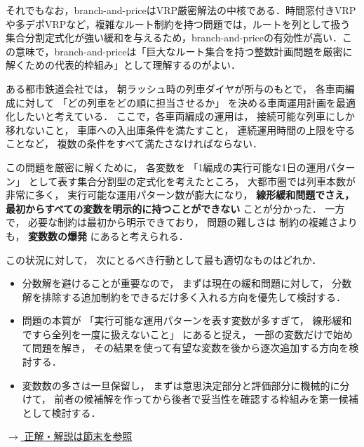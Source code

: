 それでもなお，branch-and-priceはVRP厳密解法の中核である．時間窓付きVRPや多デポVRPなど，複雑なルート制約を持つ問題では，ルートを列として扱う集合分割定式化が強い緩和を与えるため，branch-and-priceの有効性が高い．この意味で，branch-and-priceは「巨大なルート集合を持つ整数計画問題を厳密に解くための代表的枠組み」として理解するのがよい．



\begin{example}[title={クイズ5：解法の選択１}]
ある都市鉄道会社では，
朝ラッシュ時の列車ダイヤが所与のもとで，
各車両編成に対して
「どの列車をどの順に担当させるか」
を決める車両運用計画を最適化したいと考えている．
ここで，各車両編成の運用は，
接続可能な列車にしか移れないこと，
車庫への入出庫条件を満たすこと，
連続運用時間の上限を守ることなど，
複数の条件をすべて満たさなければならない．

この問題を厳密に解くために，
各変数を
「1編成の実行可能な1日の運用パターン」
として表す集合分割型の定式化を考えたところ，
大都市圏では列車本数が非常に多く，
実行可能な運用パターン数が膨大になり，
\textbf{線形緩和問題でさえ，
最初からすべての変数を明示的に持つことができない}
ことが分かった．
一方で，
必要な制約は最初から明示できており，
問題の難しさは
制約の複雑さよりも，
\textbf{変数数の爆発}
にあると考えられる．

この状況に対して，
次にとるべき行動として最も適切なものはどれか．

\begin{itemize}
\item[(ア)]
分数解を避けることが重要なので，
まずは現在の緩和問題に対して，
分数解を排除する追加制約をできるだけ多く入れる方向を優先して検討する．

\item[(イ)]
問題の本質が
「実行可能な運用パターンを表す変数が多すぎて，
線形緩和ですら全列を一度に扱えないこと」
にあると捉え，
一部の変数だけで始めて問題を解き，
その結果を使って有望な変数を後から逐次追加する方向を検討する．

\item[(ウ)]
変数数の多さは一旦保留し，
まずは意思決定部分と評価部分に機械的に分けて，
前者の候補解を作ってから後者で妥当性を確認する枠組みを第一候補として検討する．
\end{itemize}

\hyperref[ans:strict-cg-one]{$\rightarrow$ 正解・解説は節末を参照}
\end{example}

